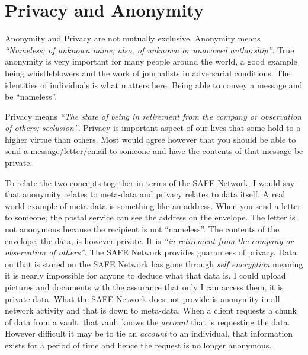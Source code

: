 \section{Privacy and Anonymity}

Anonymity and Privacy are not mutually exclusive. Anonymity means \textit{``Nameless; of unknown name; also, of unknown or unavowed authorship''}\cite{anonymous}. True anonymity is very important for many people around the world, a good example being whistleblowers and the work of journalists in adversarial conditions. The identities of individuals is what matters here. Being able to convey a message and be ``nameless''. 

Privacy means \textit{``The state of being in retirement from the company or observation of others; seclusion''}\cite{privacy}. Privacy is important aspect of our lives that some hold to a higher virtue than others. Most would agree however that you should be able to send a message/letter/email to someone and have the contents of that message be private.

To relate the two concepts together in terms of the SAFE Network, I would say that anonymity relates to meta-data and privacy relates to data itself. A real world example of meta-data is something like an address. When you send a letter to someone, the postal service can see the address on the envelope. The letter is not anonymous because the recipient is not ``nameless''. The contents of the envelope, the data, is however private. It is \textit{``in retirement from the company or observation of others''}. The SAFE Network provides guarantees of privacy. Data on that is stored on the SAFE Network has gone through \textit{self encryption} meaning it is nearly impossible for anyone to deduce what that data is. I could upload pictures and documents with the assurance that only I can access them, it is private data. What the SAFE Network does not provide is anonymity in all network activity and that is down to meta-data. When a client requests a chunk of data from a vault, that vault knows the \textit{account} that is requesting the data. However difficult it may be to tie an \textit{account} to an individual, that information exists for a period of time and hence the request is no longer anonymous.

